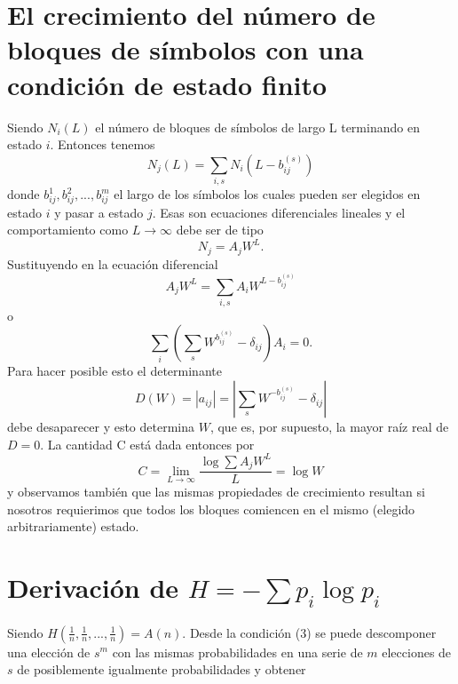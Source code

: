 \begin{appendices}

\chapter{El crecimiento del n\'umero de bloques de s\'imbolos con una
condici\'on de estado finito}
\label{aini:1}

Siendo $N_{i}(L)$ el n\'umero de bloques de s\'imbolos de largo L
terminando en estado $i$.  Entonces tenemos
\begin{equation}
N_{j}(L)=\sum_{i,s} N_{i}(L-b_{ij}^{(s)})
\end{equation}
donde $b_{ij}^{1},b_{ij}^{2},...,b_{ij}^{m}$ el largo de los s\'imbolos los cuales pueden 
ser elegidos en estado $i$ y pasar a estado $j$. Esas son ecuaciones diferenciales lineales 
y el comportamiento como $L\rightarrow \infty $ debe ser de tipo
\begin{equation}
N_{j}=A_{j}W^{L}.
\end{equation}
Sustituyendo en la ecuaci\'on diferencial 
\begin{equation}
A_{j}W^{L} = \sum_{i,s}A_{i}W^{L-b_{ij}^{(s)}}
\end{equation}
o
\begin{equation}
\sum_{i}(\sum_{s}W^{b_{ij}^{(s)}}-\delta_{ij})A_{i}=0.
\end{equation}
Para hacer posible esto el determinante
\begin{equation}
D(W)=\left| a_{ij}\right| =\left| \sum_{s}W^{-b_{ij}^{(s)}}-\delta_{ij}\right|
\end{equation}
debe desaparecer y esto determina $W$, que es, por supuesto, la mayor raíz real de $D = 0$.
La cantidad C est\'a dada entonces por
\begin{equation}
C = \lim_{L\rightarrow \infty}\frac{\log \sum A_{j}W^{L}}{L}=\log W
\end{equation}
y observamos tambi\'en que las mismas propiedades de crecimiento
resultan si nosotros requierimos que todos los bloques comiencen en el
mismo (elegido arbitrariamente) estado.

\clearpage

\chapter{Derivaci\'on de $H=-\sum p_{i}\log  p_{i}$}
\label{aini:2}

Siendo $H(\frac{1}{n},\frac{1}{n},...,\frac{1}{n})=A(n)$. Desde la
condici\'on (3) se puede descomponer una elecci\'on de $s^{m}$ con las
mismas probabilidades en una serie de $m$ elecciones de $s$ de
posiblemente igualmente probabilidades y obtener


\end{appendices}
